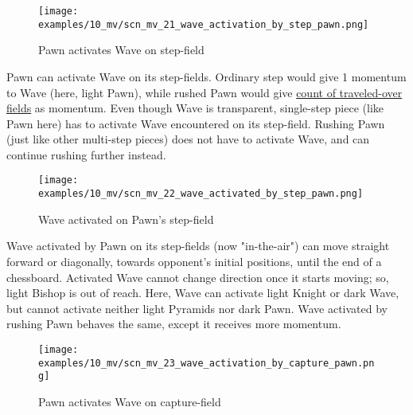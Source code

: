 \vspace*{-1.5\baselineskip}
\noindent
\begin{figure}[!h]
\texttt{[image: examples/10\_mv/scn\_mv\_21\_wave\_activation\_by\_step\_pawn.png]}
\vspace*{-1.4\baselineskip}
\caption{Pawn activates Wave on step-field}
\label{fig:scn_mv_21_wave_activation_by_step_pawn}
\end{figure}

\vspace*{-0.5\baselineskip}
Pawn can activate Wave on its step-fields. Ordinary step would give 1 momentum to
Wave (here, light Pawn), while rushed Pawn would give
\hyperref[sec:Mayan Ascendancy/Pyramid/Momentum/Fields counting]{count of traveled-over fields}
as momentum. \newline
\indent
Even though Wave is transparent, single-step piece (like Pawn here) has to activate
Wave encountered on its step-field. Rushing Pawn (just like other multi-step pieces)
does not have to activate Wave, and can continue rushing further instead.

\clearpage %

\vspace*{-2.1\baselineskip}
\noindent
\begin{figure}[!h]
\texttt{[image: examples/10\_mv/scn\_mv\_22\_wave\_activated\_by\_step\_pawn.png]}
\vspace*{-1.4\baselineskip}
\caption{Wave activated on Pawn's step-field}
\label{fig:scn_mv_22_wave_activated_by_step_pawn}
\end{figure}

\vspace*{-0.5\baselineskip}
Wave activated by Pawn on its step-fields (now "in-the-air") can move straight
forward or diagonally, towards opponent's initial positions, until the end of a
chessboard. Activated Wave cannot change direction once it starts moving; so,
light Bishop is out of reach. Here, Wave can activate light Knight or dark Wave,
but cannot activate neither light Pyramids nor dark Pawn. \newline
\indent
Wave activated by rushing Pawn behaves the same, except it receives more momentum.

\clearpage %

\vspace*{-2.1\baselineskip}
\noindent
\begin{figure}[!h]
\texttt{[image: examples/10\_mv/scn\_mv\_23\_wave\_activation\_by\_capture\_pawn.png]}
\vspace*{-1.4\baselineskip}
\caption{Pawn activates Wave on capture-field}
\label{fig:scn_mv_23_wave_activation_by_capture_pawn}
\end{figure}

